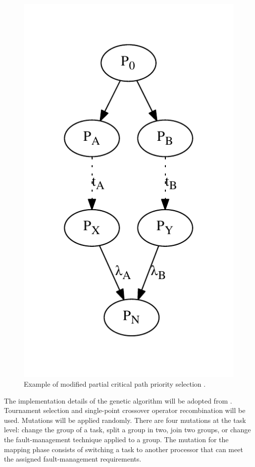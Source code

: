 \documentclass[table,11pt]{article}
\begin{document}
\begin{figure}[h]
\centering
\includegraphics[scale=0.7]{figures/crit_path}
\caption{Example of modified partial critical path priority selection \cite{eles2000scheduling}.}
\label{f:crit_path}
\end{figure}



The implementation details of the genetic algorithm will be adopted from \cite{bolchini2013reliability}. Tournament selection and single-point crossover operator recombination will be used. Mutations will be applied randomly. There are four mutations at the task level: change the group of a task, split a group in two, join two groups, or change the fault-management technique applied to a group. The mutation for the mapping phase consists of switching a task to another processor that can meet the assigned fault-management requirements.
\end{document}
